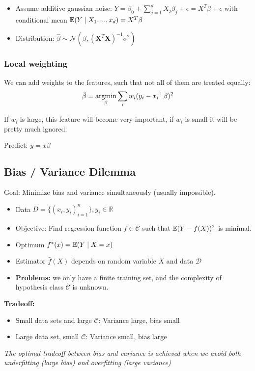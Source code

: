 \begin{itemize}
	\item Assume additive gaussian noise: $Y = \beta_0 + \sum_{j = 1}^d X_j\beta_j + \epsilon = X^T\beta + \epsilon $ with conditional mean $\mathbb E(Y\mid X_1, ..., x_d) = X^T\beta$
	\item Distribution: $\hat \beta \sim \mathcal N(\beta, (\mathbf X^T\mathbf X)^{-1}\sigma^2)$
\end{itemize}

\subsubsection{Local weighting}
We can add weights to the features, such that not all of them are treated equally:
\begin{equation*}
	\hat\beta = \mathop{\mathrm{argmin}}_\beta \sum_i w_i (y_i - {x_i}^\top\beta)^2 
\end{equation*}

If $w_i$ is large, this feature will become very important, if $w_i$ is small it will be pretty much ignored.

Predict: $y = x\beta$


\subsection{Bias / Variance Dilemma}
Goal: Minimize bias and variance simultaneously (usually impossible).
\begin{itemize}
	\item Data $D = \{(x_i, y_i)_{i = 1}^n\}, y_i\in \mathbb R$
	\item Objective: Find regression function $f\in \mathcal C$ such that $\mathbb E( Y - f(X))^2$ is minimal.
	\item Optimum $f^*(x) = \mathbb E(Y \mid X=x)$
	\item Estimator $\hat f(X)$ depends on random variable $X$ and data $\mathcal D$
	\item \textbf{Problems: } we only have a finite training set, and the complexity of hypothesis class $\mathcal C$ is unknown.
\end{itemize}

\vspace{1em}
\textbf{Tradeoff: }
\begin{itemize}
	\item Small data sets and large $\mathcal C$: Variance large, bias small
	\item Large data set, small $\mathcal C$: Variance small, bias large
\end{itemize}
\textit{The optimal tradeoff between bias and variance is achieved when we avoid both underfitting (large bias) and overfitting (large variance)}

